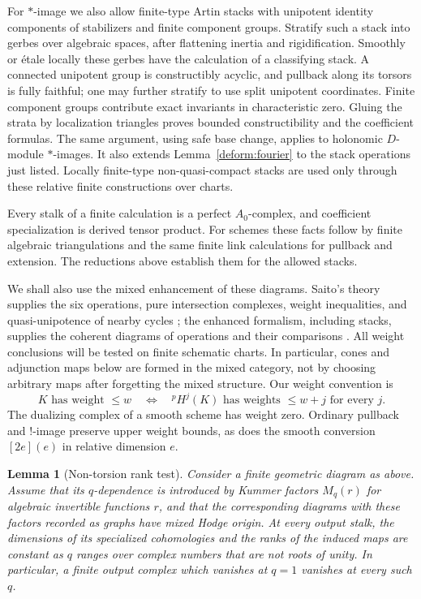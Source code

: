 \documentclass[11pt]{article}
\numberwithin{equation}{section}
\newtheorem{lemma}[theorem]{Lemma}
\theoremstyle{definition}
\theoremstyle{remark}
\begin{document}
For $*$-image we also allow finite-type Artin stacks with unipotent
identity components of stabilizers and finite component groups.
Stratify such a stack into gerbes over algebraic spaces, after
flattening inertia and rigidification.  Smoothly or \'etale locally
these gerbes have the calculation of a classifying stack.  A
connected unipotent group is constructibly acyclic, and pullback
along its torsors is fully faithful; one may further stratify to
use split unipotent coordinates.  Finite component groups contribute
exact invariants in characteristic zero.  Gluing the strata by
localization triangles proves bounded constructibility and the
coefficient formulas.  The same argument, using safe base change,
applies to holonomic $D$-module $*$-images.  It also extends
Lemma~\ref{deform:fourier} to the stack operations just listed.
Locally finite-type non-quasi-compact stacks are used only through
these relative finite constructions over charts.

Every stalk of a finite calculation is a perfect $A_0$-complex, and
coefficient specialization is derived tensor product.  For schemes
these facts follow by finite algebraic triangulations and the same
finite link calculations for pullback and extension.  The reductions
above establish them for the allowed stacks.

We shall also use the mixed enhancement of these diagrams.  Saito's
theory supplies the six operations, pure intersection complexes,
weight inequalities, and quasi-unipotence of nearby cycles
\cite{SaitoMHM}; the enhanced formalism, including stacks, supplies
the coherent diagrams of operations and their comparisons
\cite[Sections~1 and~3]{TubachMHM}.  All weight conclusions will be
tested on finite schematic charts.  In particular, cones and
adjunction maps below are formed in the mixed category, not by
choosing arbitrary maps after forgetting the mixed structure.
Our weight convention is
\[
 K\text{ has weight }\le w
 \quad\Longleftrightarrow\quad
 {}^pH^j(K)\text{ has weights }\le w+j\text{ for every }j.
\]
The dualizing complex of a smooth scheme has weight zero.
Ordinary pullback and $!$-image preserve upper weight bounds, as does
the smooth conversion $[2e](e)$ in relative dimension $e$.

\begin{lemma}[Non-torsion rank test]\label{deform:rank}
Consider a finite geometric diagram as above.  Assume that its
$q$-dependence is introduced by Kummer factors $M_q(r)$ for algebraic
invertible functions $r$, and that the corresponding diagrams with
these factors recorded as graphs have mixed Hodge origin.  At every
output stalk, the dimensions of its specialized cohomologies and
the ranks of the induced maps are constant as $q$ ranges over
complex numbers that are not roots of unity.  In particular, a
finite output complex which vanishes at $q=1$ vanishes at every such
$q$.
\end{lemma}
\end{document}
